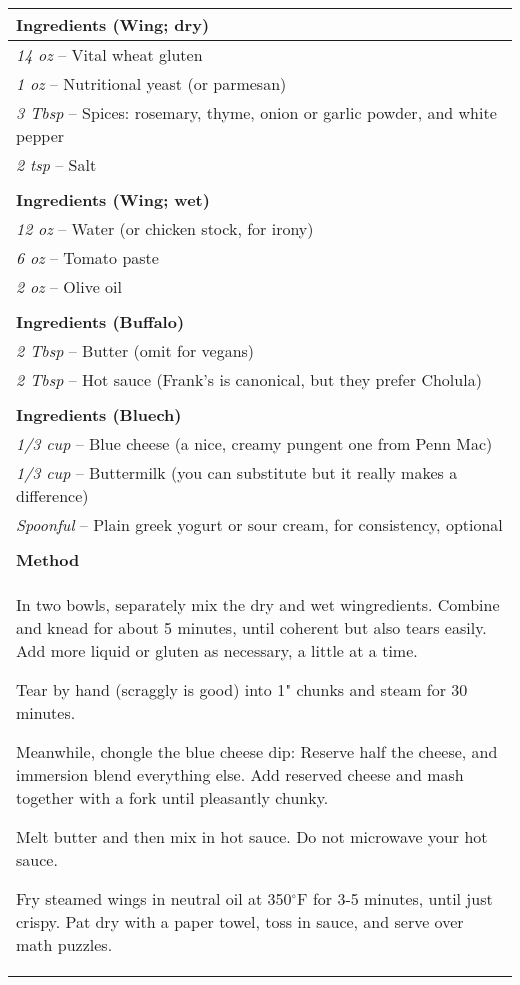 \documentclass[12pt]{article}
\begin{document}
\noindent \begin{tabular}{p{}}
	{\bf Ingredients (Wing; dry)} \\
	\hline
	{\em 14 oz} -- Vital wheat gluten \\
	{\em 1 oz} -- Nutritional yeast (or parmesan) \\
	{\em 3 Tbsp} -- Spices: rosemary, thyme, onion or garlic powder, and white pepper \\
	{\em 2 tsp} -- Salt \\
	\\
	{\bf Ingredients (Wing; wet)} \\
	\hline
	{\em 12 oz} -- Water (or chicken stock, for irony) \\
	{\em 6 oz} -- Tomato paste \\
	{\em 2 oz} -- Olive oil \\
	\\
	{\bf Ingredients (Buffalo)} \\
	\hline
	{\em 2 Tbsp} -- Butter (omit for vegans) \\
	{\em 2 Tbsp} -- Hot sauce (Frank's is canonical, but they prefer Cholula) \\
	\\
	{\bf Ingredients (Bluech)} \\
	\hline
	{\em 1/3 cup} -- Blue cheese (a nice, creamy pungent one from Penn Mac) \\
	{\em 1/3 cup} -- Buttermilk (you can substitute but it really makes a difference) \\
	{\em Spoonful} -- Plain greek yogurt or sour cream, for consistency, optional \\
	\\
	{\bf Method} \\
	\hline
\setlength{\parskip}{0.5em}
	In two bowls, separately mix the dry and wet wingredients. Combine and knead for about 5 minutes, until coherent but also tears easily. Add more liquid or gluten as necessary, a little at a time.

	Tear by hand (scraggly is good) into 1" chunks and steam for 30 minutes.

	Meanwhile, chongle the blue cheese dip: Reserve half the cheese, and immersion blend everything else. Add reserved cheese and mash together with a fork until pleasantly chunky.

	Melt butter and then mix in hot sauce. Do not microwave your hot sauce.

	Fry steamed wings in neutral oil at 350$^{\circ}$F for 3-5 minutes, until just crispy. Pat dry with a paper towel, toss in sauce, and serve over math puzzles.
\end{tabular}
\end{document}
